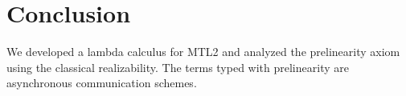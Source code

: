 

\section{Conclusion}
\label{sec:conclude}
We developed a lambda calculus for MTL2 and
analyzed the prelinearity axiom using
the classical realizability.  The terms typed with prelinearity are
asynchronous communication schemes.
